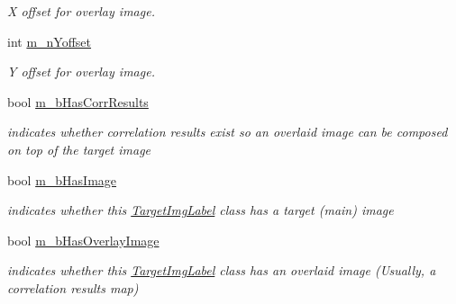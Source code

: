 \begin{DoxyCompactItemize}
\begin{DoxyCompactList}\small\item\em X offset for overlay image. \item\end{DoxyCompactList}\item 
\hypertarget{classTargetImgLabel_a46624a74854a56d43895ecea4b2a3da5}{
int \hyperlink{classTargetImgLabel_a46624a74854a56d43895ecea4b2a3da5}{m\_\-nYoffset}}
\label{classTargetImgLabel_a46624a74854a56d43895ecea4b2a3da5}

\begin{DoxyCompactList}\small\item\em Y offset for overlay image. \item\end{DoxyCompactList}\item 
\hypertarget{classTargetImgLabel_a34a2b6061eb38412b7f7e88fbf741c2f}{
bool \hyperlink{classTargetImgLabel_a34a2b6061eb38412b7f7e88fbf741c2f}{m\_\-bHasCorrResults}}
\label{classTargetImgLabel_a34a2b6061eb38412b7f7e88fbf741c2f}

\begin{DoxyCompactList}\small\item\em indicates whether correlation results exist so an overlaid image can be composed on top of the target image \item\end{DoxyCompactList}\item 
\hypertarget{classTargetImgLabel_a3b0b34d9c2f7c4f6c9aea8bc75d91d99}{
bool \hyperlink{classTargetImgLabel_a3b0b34d9c2f7c4f6c9aea8bc75d91d99}{m\_\-bHasImage}}
\label{classTargetImgLabel_a3b0b34d9c2f7c4f6c9aea8bc75d91d99}

\begin{DoxyCompactList}\small\item\em indicates whether this \hyperlink{classTargetImgLabel}{TargetImgLabel} class has a target (main) image \item\end{DoxyCompactList}\item 
\hypertarget{classTargetImgLabel_a1c34173d16f00af22f7db9e1bb3e7b30}{
bool \hyperlink{classTargetImgLabel_a1c34173d16f00af22f7db9e1bb3e7b30}{m\_\-bHasOverlayImage}}
\label{classTargetImgLabel_a1c34173d16f00af22f7db9e1bb3e7b30}

\begin{DoxyCompactList}\small\item\em indicates whether this \hyperlink{classTargetImgLabel}{TargetImgLabel} class has an overlaid image (Usually, a correlation results map) \item\end{DoxyCompactList}\end{DoxyCompactItemize}


